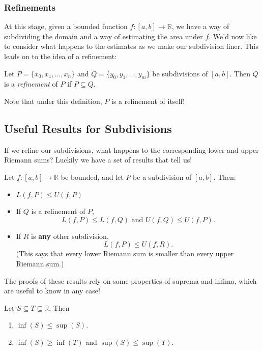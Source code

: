\documentclass[
  17pt,
  a4paper]{extarticle}
\providecommand{\tightlist}{%
  \setlength{\itemsep}{0pt}\setlength{\parskip}{0pt}}
\theoremstyle{plain}
\theoremstyle{definition}
\theoremstyle{plain}
\theoremstyle{plain}
\theoremstyle{plain}
\theoremstyle{plain}
\theoremstyle{definition}
\theoremstyle{definition}
\theoremstyle{remark}
\theoremstyle{remark}
\let\BeginKnitrBlock\begin \let\EndKnitrBlock\end
\renewcommand{\;}{\,}
\begin{document}
\hypertarget{refinements}{%
\subsubsection{Refinements}\label{refinements}}

At this stage, given a bounded function \(f:[a,b] \to \mathbb{R}\), we have a way of subdividing the domain and a way of estimating the area under \(f\). We'd now like to consider what happens to the estimates as we make our subdivision finer. This leads on to the idea of a refinement:

\BeginKnitrBlock{definition}[Refinement]
{\label{def:def4} }Let \(P = \lbrace x_0, x_1, \ldots, x_n \rbrace\) and \(Q = \lbrace y_0, y_1, \ldots, y_m \rbrace\) be subdivisions of \([a,b].\) Then \(Q\) is a \emph{refinement} of \(P\) if \(P\subseteq Q\).
\EndKnitrBlock{definition}
Note that under this definition, \(P\) is a refinement of itself!

\hypertarget{useful-results-for-subdivisions}{%
\subsection{Useful Results for Subdivisions}\label{useful-results-for-subdivisions}}

If we refine our subdivisions, what happens to the corresponding lower and upper Riemann sums? Luckily we have a set of results that tell us!

\BeginKnitrBlock{proposition}
{\label{prp:prop1} }Let \(f:[a,b] \to \mathbb{R}\) be bounded, and let \(P\) be a subdivision of \([a,b].\) Then:

\begin{itemize}
\tightlist
\item
  \(L(f,P) \leq U(f,P)\)
\item
  If \(Q\) is a refinement of \(P\), \[L(f,P) \leq L(f,Q)\;\; \text{and} \;\; U(f,Q) \leq U(f,P).\]
\item
  If \(R\) is \textbf{any} other subdivision, \[L(f,P) \leq U(f,R).\] (This says that every lower Riemann sum is smaller than every upper Riemann sum.)
\end{itemize}
\EndKnitrBlock{proposition}

The proofs of these results rely on some properties of suprema and infima, which are useful to know in any case!

\BeginKnitrBlock{proposition}
{\label{prp:prop2} }
Let \(S \subseteq T \subseteq \mathbb{R}\). Then

\begin{enumerate}
\def\labelenumi{\arabic{enumi}.}
\tightlist
\item
  \(\inf(S) \leq \sup(S).\)
\item
  \(\inf(S) \geq \inf(T)\) and \(\sup(S) \leq \sup(T).\)
\end{enumerate}
\EndKnitrBlock{proposition}
\end{document}
